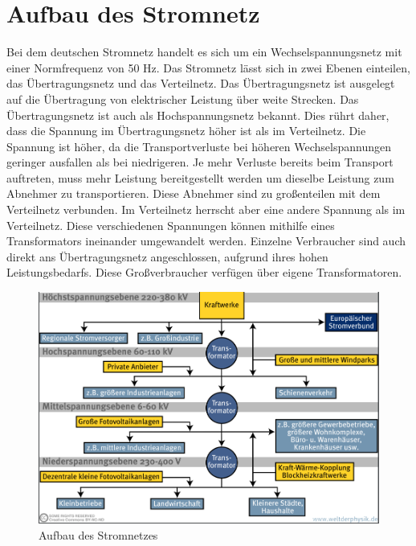 \section{Aufbau des Stromnetz}
\label{capBack:Stromnetz}
Bei dem deutschen Stromnetz handelt es sich um ein Wechselspannungsnetz mit einer Normfrequenz von 50 Hz. Das Stromnetz lässt sich in zwei Ebenen einteilen, das Übertragungsnetz und das Verteilnetz. Das Übertragungsnetz ist ausgelegt auf die Übertragung von elektrischer Leistung über weite Strecken. Das Übertragungsnetz ist auch als Hochspannungsnetz bekannt. Dies rührt daher, dass die Spannung im Übertragungsnetz höher ist als im Verteilnetz. Die Spannung ist höher, da die Transportverluste bei höheren Wechselspannungen geringer ausfallen als bei niedrigeren. Je mehr Verluste bereits beim Transport auftreten, muss mehr Leistung bereitgestellt werden um dieselbe Leistung zum Abnehmer zu transportieren. Diese Abnehmer sind zu großenteilen mit dem Verteilnetz verbunden. Im Verteilnetz herrscht aber eine andere Spannung als im Verteilnetz. Diese verschiedenen Spannungen können mithilfe eines Transformators ineinander umgewandelt werden. Einzelne Verbraucher sind auch direkt ans Übertragungsnetz angeschlossen, aufgrund ihres hohen Leistungsbedarfs. Diese Großverbraucher verfügen über eigene Transformatoren.
\begin{figure}[h!]
	\includegraphics[width=\linewidth]{img/Stromnetz1.png}
	\caption{Aufbau des Stromnetzes}
	\label{Abb1_Stromnetz}
\end{figure}



